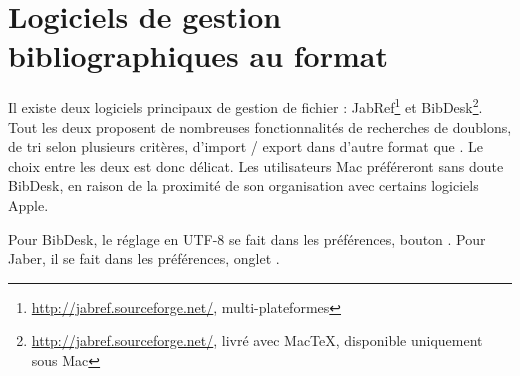 \section{Logiciels de gestion bibliographiques au format }

Il existe deux logiciels principaux de gestion de fichier  : JabRef\footnote{\url{http://jabref.sourceforge.net/}, multi-plateformes} et BibDesk\footnote{\url{http://jabref.sourceforge.net/}, livré avec MacTeX, disponible uniquement sous Mac}. Tout les deux proposent de nombreuses fonctionnalités de recherches de doublons, de tri selon plusieurs critères, d'import / export dans d'autre format que . Le choix entre les deux est donc délicat.  Les utilisateurs Mac préféreront sans doute BibDesk, en raison de la proximité de son organisation avec certains logiciels Apple. 

Pour BibDesk, le réglage en UTF-8 se fait dans les préférences, bouton . Pour  Jaber, il se fait dans les préférences, onglet .

%
%
